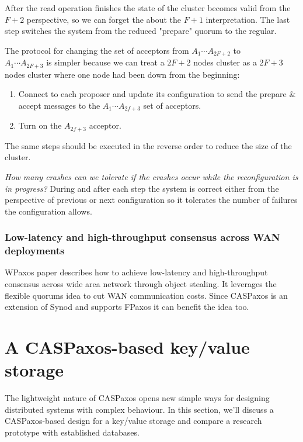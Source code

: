 \documentclass[12pt]{article}
\theoremstyle{definition}
\begin{document}
After the read operation finishes the state of the cluster becomes valid from the $F+2$ perspective, so we can forget the about the $F+1$ interpretation. The last step switches the system from the reduced "prepare" quorum to the regular.

The protocol for changing the set of acceptors from $A_1 \cdots A_{2F+2}$ to \\
$A_1 \cdots A_{2F+3}$ is simpler because we can treat a $2F+2$ nodes cluster as a $2F+3$ nodes cluster where one node had been down from the beginning:
\begin{enumerate}
  \item Connect to each proposer and update its configuration to send the prepare \& accept messages to the $A_1 \cdots A_{2f+3}$ set of acceptors.
  \item Turn on the $A_{2f+3}$ acceptor.
\end{enumerate}

The same steps should be executed in the reverse order to reduce the size of the cluster.

{\it How many crashes can we tolerate if the crashes occur while the reconfiguration is in progress?} During and after each step the system is correct either from the perspective of previous or next configuration so it tolerates the number of failures the configuration allows.

\subsubsection{Low-latency and high-throughput consensus across WAN deployments}

WPaxos\cite{wpaxos} paper describes how to achieve low-latency and high-throughput consensus across wide area network through object stealing. It leverages the flexible quorums\cite{fpaxos} idea to cut WAN communication costs. Since CASPaxos is an extension of Synod and supports FPaxos it can benefit the idea too.

\section{A CASPaxos-based key/value storage}

The lightweight nature of CASPaxos opens new simple ways for designing distributed systems with complex behaviour. In this section, we'll discuss a CASPaxos-based design for a key/value storage and compare a research prototype with established databases.
\end{document}
